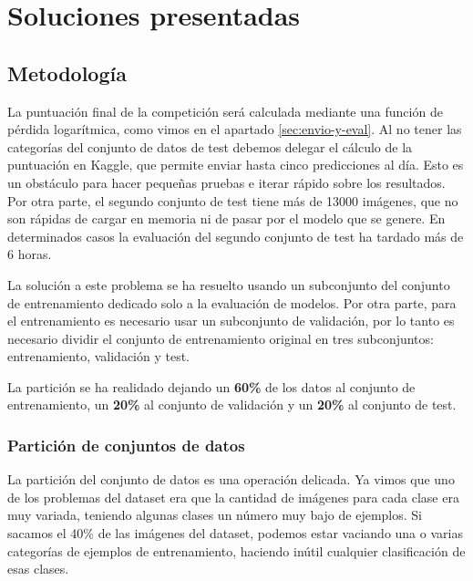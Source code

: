 
\chapter{Soluciones presentadas} %
\label{cap:soluciones} %

\section{Metodología}
\label{sec:metodology}

La puntuación final de la competición será calculada mediante una función de pérdida logarítmica, como vimos en el apartado \ref{sec:envio-y-eval}. Al no tener las categorías del conjunto de datos de test debemos delegar el cálculo de la puntuación en Kaggle, que permite enviar hasta cinco predicciones al día. Esto es un obstáculo para hacer pequeñas pruebas e iterar rápido sobre los resultados. Por otra parte, el segundo conjunto de test tiene más de 13000 imágenes, que no son rápidas de cargar en memoria ni de pasar por el modelo que se genere. En determinados casos la evaluación del segundo conjunto de test ha tardado más de 6 horas.

La solución a este problema se ha resuelto usando un subconjunto del conjunto de entrenamiento dedicado solo a la evaluación de modelos. Por otra parte, para el entrenamiento es necesario usar un subconjunto de validación, por lo tanto es necesario dividir el conjunto de entrenamiento original en tres subconjuntos: entrenamiento, validación y test.

La partición se ha realidado dejando un \textbf{60\%} de los datos al conjunto de entrenamiento, un \textbf{20\%} al conjunto de validación y un \textbf{20\%} al conjunto de test.


\subsection{Partición de conjuntos de datos}
La partición del conjunto de datos es una operación delicada. Ya vimos que uno de los problemas del dataset era que la cantidad de imágenes para cada clase era muy variada, teniendo algunas clases un número muy bajo de ejemplos. Si sacamos el 40\% de las imágenes del dataset, podemos estar vaciando una o varias categorías de ejemplos de entrenamiento, haciendo inútil cualquier clasificación de esas clases.

